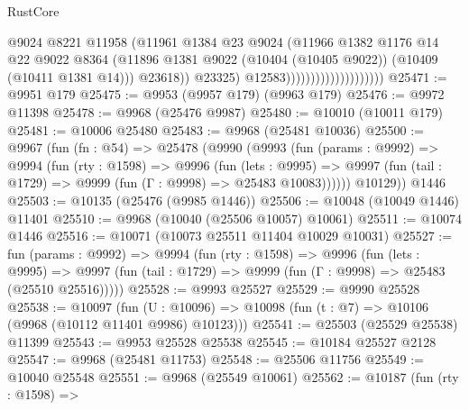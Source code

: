 \begin{lexlean}{RustCore}
\begin{coremodule}
                                              @9024
                                              @8221
                                              @11958
                                              (@11961
                                                @1384
                                                @23
                                                @9024
                                                (@11966
                                                  @1382
                                                  @1176
                                                  @14
                                                  @22
                                                  @9022
                                                  @8364
                                                  (@11896
                                                    @1381
                                                    @9022
                                                    (@10404 (@10405 @9022))
                                                    (@10409 (@10411 @1381 @14)))
                                                  @23618))
                                              @23325)
                                            @12583))))))))))))))))))))
@25471 := @9951 @179
@25475 := @9953 (@9957 @179) (@9963 @179)
@25476 := @9972 @11398
@25478 := @9968 (@25476 @9987)
@25480 := @10010 (@10011 @179)
@25481 := @10006 @25480
@25483 := @9968 (@25481 @10036)
@25500 := @9967
    (fun (fn : @54) =>
    @25478
      (@9990
        (@9993
          (fun (params : @9992) =>
          @9994
            (fun (rty : @1598) =>
            @9996
              (fun (lets : @9995) =>
              @9997 (fun (tail : @1729) => @9999 (fun (Γ : @9998) => @25483 @10083))))))
        @10129))
    @1446
@25503 := @10135 (@25476 (@9985 @1446))
@25506 := @10048 (@10049 @1446) @11401
@25510 := @9968 (@10040 (@25506 @10057) @10061)
@25511 := @10074 @1446
@25516 := @10071 (@10073 @25511 @11404 @10029 @10031)
@25527 := fun (params : @9992) =>
  @9994
    (fun (rty : @1598) =>
    @9996
      (fun (lets : @9995) =>
      @9997 (fun (tail : @1729) => @9999 (fun (Γ : @9998) => @25483 (@25510 @25516)))))
@25528 := @9993 @25527
@25529 := @9990 @25528
@25538 := @10097
    (fun (U : @10096) => @10098 (fun (t : @7) => @10106 (@9968 (@10112 @11401 @9986) @10123)))
@25541 := @25503 (@25529 @25538) @11399
@25543 := @9953 @25528 @25538
@25545 := @10184 @25527 @2128
@25547 := @9968 (@25481 @11753)
@25548 := @25506 @11756
@25549 := @10040 @25548
@25551 := @9968 (@25549 @10061)
@25562 := @10187
    (fun (rty : @1598) =>

\end{coremodule}
\end{lexlean}
